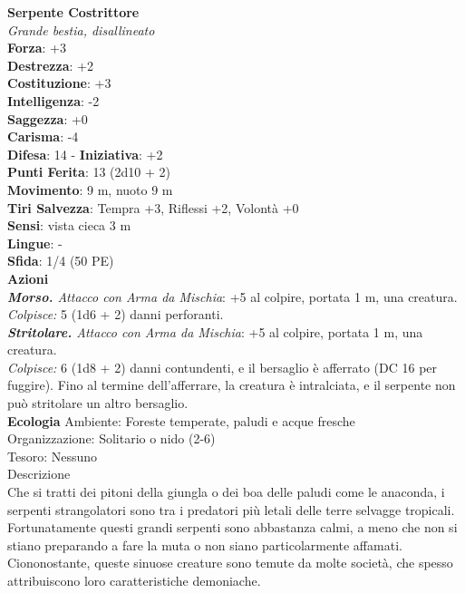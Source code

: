 \begin{multicols}{2}
\medskip\textbf{Serpente Costrittore}\\
\emph{Grande bestia, disallineato}\\
\textbf{Forza}: +3\\
\textbf{Destrezza}: +2\\
\textbf{Costituzione}: +3\\
\textbf{Intelligenza}: -2\\
\textbf{Saggezza}: +0\\
\textbf{Carisma}: -4\\
\textbf{Difesa}: 14 - \textbf{Iniziativa}: +2\\
\textbf{Punti Ferita}: 13 (2d10 + 2)\\
\textbf{Movimento}: 9 m, nuoto 9 m\\
\textbf{Tiri Salvezza}: Tempra +3, Riflessi +2, Volontà +0\\
\textbf{Sensi}: vista cieca 3 m\\
\textbf{Lingue}: -\\
\textbf{Sfida}: 1/4 (50 PE)\smallskip\\
\smallskip\textbf{Azioni}\\
\emph{\textbf{Morso.} Attacco con Arma da Mischia}: +5 al colpire, portata 1 m, una creatura.\\
\emph{Colpisce:} 5 (1d6 + 2) danni perforanti.\\
\emph{\textbf{Stritolare.} Attacco con Arma da Mischia}: +5 al colpire, portata 1 m, una creatura.\\
\emph{Colpisce:} 6 (1d8 + 2) danni contundenti, e il bersaglio è afferrato (DC  16 per fuggire). Fino al termine dell'afferrare, la creatura è intralciata, e il serpente non può stritolare un altro bersaglio.\\
\textbf{Ecologia}
Ambiente: Foreste temperate, paludi e acque fresche\\
Organizzazione: Solitario o nido (2-6)\\
Tesoro: Nessuno\\
Descrizione\\
Che si tratti dei pitoni della giungla o dei boa delle paludi come le anaconda, i serpenti strangolatori sono tra i predatori più letali delle terre selvagge tropicali. Fortunatamente questi grandi serpenti sono abbastanza calmi, a meno che non si stiano preparando a fare la muta o non siano particolarmente affamati. Ciononostante, queste sinuose creature sono temute da molte società, che spesso attribuiscono loro caratteristiche demoniache.\\


\end{multicols}
